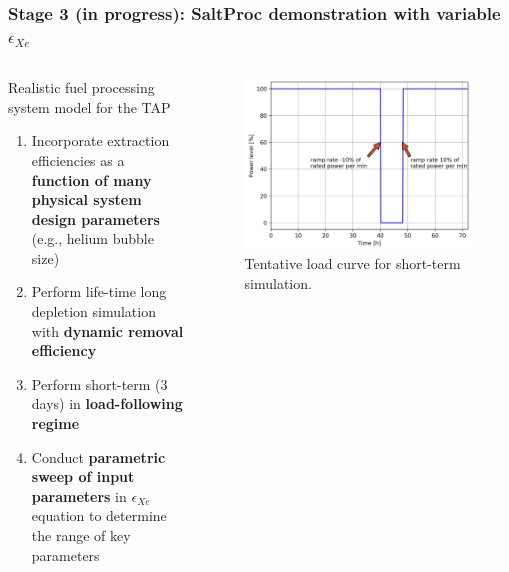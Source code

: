 \begin{frame}
	\frametitle{Stage 3 (in progress): SaltProc demonstration with variable 
	$\epsilon_{Xe}$}
	\begin{columns}
	\column{7cm}
\begin{block}{Realistic fuel processing system model for the \gls{TAP}}
	\begin{enumerate}
		\itemsep1em
		\item Incorporate extraction efficiencies as a \textbf{function of 
		many physical system design	parameters} (e.g., helium bubble size)
		\item Perform life-time long depletion simulation with \textbf{dynamic 
		removal efficiency}
		\item Perform short-term (3 days) in \textbf{load-following regime}
		\item Conduct \textbf{parametric sweep of input parameters} in 
		$\epsilon_{Xe}$ 
		equation to determine the range of key parameters
	\end{enumerate}
\end{block}
	\column{4.5cm}
	\begin{figure}[bth!] %
		\centering
		\includegraphics[width=1.1\textwidth]{../figures/load_curve.png}
		\caption{Tentative load curve for short-term simulation.}
		\label{fig:load}
	\end{figure}
	\end{columns}
\end{frame}



